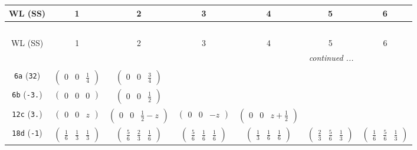 \documentclass[fleqn,9pt,landscape]{jsarticle}
\begin{document}
\begin{center}
\renewcommand{\arraystretch}{1.2}
\begin{longtable}{ccccccc}
 \hline \hline
WL (SS) & 1 & 2 & 3 & 4 & 5 & 6 \\ \hline \endfirsthead

\multicolumn{6}{l}{\tablename\ \thetable{}} \\
 \hline \hline
WL (SS) & 1 & 2 & 3 & 4 & 5 & 6 \\ \hline \endhead

 \hline \hline
\multicolumn{6}{r}{\footnotesize\it continued ...} \\ \endfoot

 \hline \hline
\multicolumn{6}{r}{} \\ \endlastfoot

{\tt 6a} ({\tt 32}) & $ \begin{pmatrix} 0 & 0 & \frac{1}{4} \end{pmatrix} $ & $ \begin{pmatrix} 0 & 0 & \frac{3}{4} \end{pmatrix} $ & $  $ & $  $ & $  $ & $  $ \\ \hline
{\tt 6b} ({\tt -3.}) & $ \begin{pmatrix} 0 & 0 & 0 \end{pmatrix} $ & $ \begin{pmatrix} 0 & 0 & \frac{1}{2} \end{pmatrix} $ & $  $ & $  $ & $  $ & $  $ \\ \hline
{\tt 12c} ({\tt 3.}) & $ \begin{pmatrix} 0 & 0 & z \end{pmatrix} $ & $ \begin{pmatrix} 0 & 0 & \frac{1}{2} - z \end{pmatrix} $ & $ \begin{pmatrix} 0 & 0 & - z \end{pmatrix} $ & $ \begin{pmatrix} 0 & 0 & z + \frac{1}{2} \end{pmatrix} $ & $  $ & $  $ \\ \hline
{\tt 18d} ({\tt -1}) & $ \begin{pmatrix} \frac{1}{6} & \frac{1}{3} & \frac{1}{3} \end{pmatrix} $ & $ \begin{pmatrix} \frac{5}{6} & \frac{2}{3} & \frac{1}{6} \end{pmatrix} $ & $ \begin{pmatrix} \frac{5}{6} & \frac{1}{6} & \frac{1}{6} \end{pmatrix} $ & $ \begin{pmatrix} \frac{1}{3} & \frac{1}{6} & \frac{1}{6} \end{pmatrix} $ & $ \begin{pmatrix} \frac{2}{3} & \frac{5}{6} & \frac{1}{3} \end{pmatrix} $ & $ \begin{pmatrix} \frac{1}{6} & \frac{5}{6} & \frac{1}{3} \end{pmatrix} $ \\ \hline

\end{longtable}
\end{center}
\end{document}
